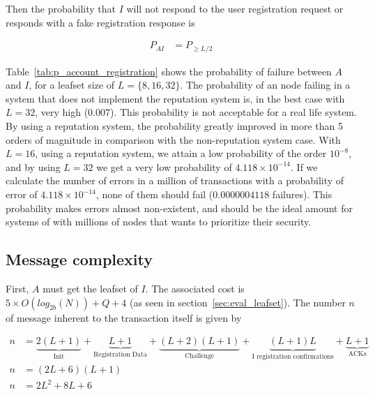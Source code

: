 
    Then the probability that $I$ will not respond to the user registration
request or responds with a fake registration response is

    \begin{align}
      P_{AI} &= P_{\ge L/2} 
    \end{align}


    Table~\eqref{tab:p_account_registration} shows the probability of failure
between $A$ and $I$, for a leafset size of $L = \{8,16,32\}$. The probability
of an node failing in a system that does not implement the reputation system
is, in the best case with $L=32$, very high ($0.007$). This probability is not
acceptable for a real life system.  By using a reputation system, the probability greatly
improved in more than 5 orders of magnitude in comparison with the
non-reputation system case. With $L=16$, using a reputation system, we attain
a low probability of the order $10^{-8}$, and by using $L=32$ we get a very low
probability of $4.118 \times 10^{-14}$. If we calculate the number of
errors in a million of transactions with a probability of error of $4.118
\times 10^{-14}$, none of them should fail ($0.0000004118$ failures). This probability
makes errors almost non-existent, and should be the ideal amount for systems of with
millions of nodes that wants to prioritize their security.

    
  \subsection{Message complexity}

    First, $A$ must get the leafset of $I$. The associated cost is $5
\times O(log_{2b}(N)) + Q + 4$ (as seen in section~\ref{sec:eval_leafset}).
    The number $n$ of message inherent to the transaction itself is given by

    \begin{align}
      n &= \underbrace{2(L+1)}_\text{Init} +
           \underbrace{L+1}_\text{Registration Data} +
           \underbrace{(L+2)(L+1)}_\text{Challenge} +
           \underbrace{(L+1)L}_\text{I registration confirmations} +
           \underbrace{L+1}_\text{ACKs}\\
      n &= (2L+6)(L+1)\\
      n &= 2L^2+ 8L + 6
    \end{align}

